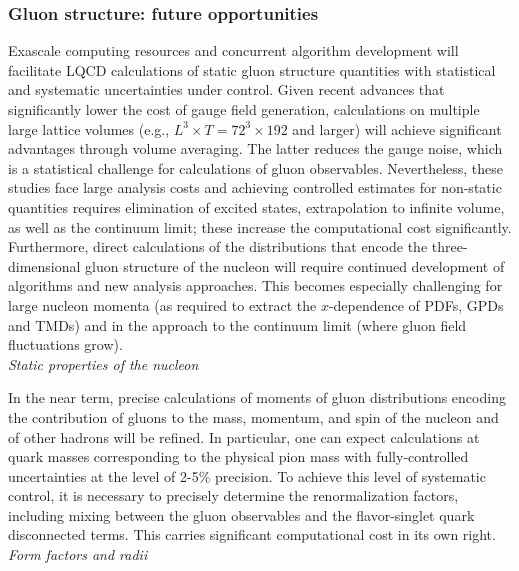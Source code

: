 \subsubsection{Gluon structure: future opportunities}

Exascale computing resources and concurrent algorithm development will facilitate LQCD calculations of static gluon structure quantities with statistical and systematic uncertainties under control. Given recent advances that significantly lower the cost of gauge field generation, calculations on multiple large lattice volumes (e.g., $L^3\times T=72^3 \times 192$ and larger) will achieve significant advantages through volume averaging. The latter reduces the gauge noise, which is a statistical challenge for calculations of gluon observables. Nevertheless, these studies face large analysis costs and achieving controlled estimates for non-static quantities requires elimination of excited states, extrapolation to infinite volume, as well as the continuum limit; these increase the computational cost significantly. Furthermore, direct calculations of the distributions that encode the three-dimensional gluon structure of the nucleon will require continued development of algorithms and new analysis approaches.
This becomes especially challenging for large nucleon momenta (as required to extract the $x$-dependence of PDFs, GPDs and TMDs) and in the approach to the continuum limit (where gluon field fluctuations grow). \\


{\it Static properties of the nucleon}

In the near term, precise calculations of moments of gluon distributions encoding the contribution of gluons to the mass, momentum, and spin of the nucleon and of other hadrons will be refined. In particular, one can expect calculations at quark masses corresponding to the physical pion mass with fully-controlled uncertainties at the level of 2-5\% precision. To achieve this level of systematic control, it is necessary to precisely determine the renormalization factors, including mixing between the gluon observables and the flavor-singlet quark disconnected terms. This carries significant computational cost in its own right.\\
 

{\it Form factors and radii}

